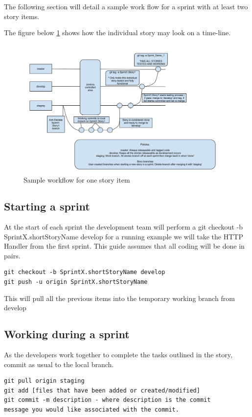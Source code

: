 The following section will detail a sample work flow for a sprint with at least two story items. 

The figure below \ref{fig:architecture} shows how the individual story may look on a time-line.
\begin{figure}[htb]
\centering
\includegraphics[width=1\textwidth]{img/workflow}
\caption{Sample workflow for one story item}
\label{fig:architecture}
\end{figure}


\subsection{Starting a sprint}

\label{gitworkflow}
At the start of each sprint the development team will perform a git checkout -b SprintX.shortStoryName develop
for a running example we will take the HTTP Handler from the first sprint. This guide assumes that all coding will be done in pairs.
\begin{verbatim}
git checkout -b SprintX.shortStoryName develop
git push -u origin SprintX.shortStoryName
\end{verbatim}
This will pull all the previous items into the temporary working branch from develop

\subsection{Working during a sprint}

As the developers work together to complete the tasks outlined in the story, commit as usual to the local branch.\\
\begin{verbatim}
git pull origin staging
git add [files that have been added or created/modified]
git commit -m description - where description is the commit 
message you would like associated with the commit. 
\end{verbatim}

